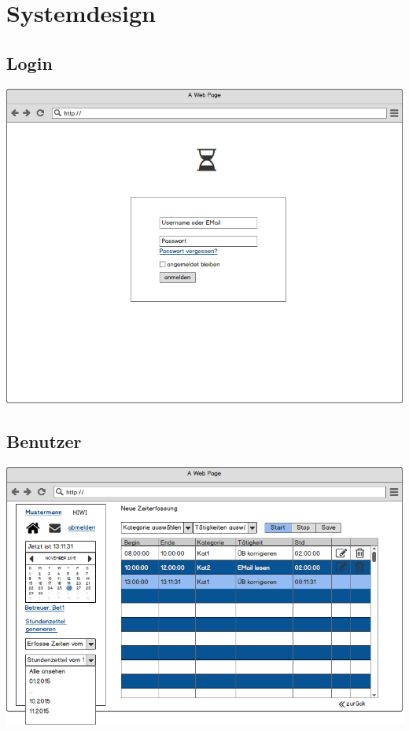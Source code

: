 \section{Systemdesign}


\subsection{Login}
\includegraphics[width=\linewidth]{UI/Login/Login.png}

\subsection{Benutzer}
\includegraphics[width=\linewidth]{UI/Benutzer/Zeiterfassung.png}

